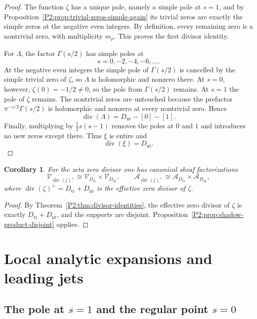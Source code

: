 \documentclass[11pt,a4paper]{article}
\numberwithin{equation}{section}
\newtheorem{corollary}[theorem]{Corollary}
\theoremstyle{definition}
\theoremstyle{remark}
\DeclareMathOperator{\divv}{div}
\newcommand{\cV}{\mathcal V}
\newcommand{\cA}{\mathcal A}
\begin{document}
\begin{proof}
The function $\zeta$ has a unique pole, namely a simple pole at $s=1$, and by Proposition~\ref{P2:prop:trivial-zeros-simple-again} its trivial zeros are exactly the simple zeros at the negative even integers.  By definition, every remaining zero is a nontrivial zero, with multiplicity $m_\rho$.  This proves the first divisor identity.

For $\Lambda$, the factor $\Gamma(s/2)$ has simple poles at
\[
s=0,-2,-4,-6,\dots.
\]
At the negative even integers the simple pole of $\Gamma(s/2)$ is cancelled by the simple trivial zero of $\zeta$, so $\Lambda$ is holomorphic and nonzero there.  At $s=0$, however, $\zeta(0)=-1/2\neq 0$, so the pole from $\Gamma(s/2)$ remains.  At $s=1$ the pole of $\zeta$ remains.  The nontrivial zeros are untouched because the prefactor $\pi^{-s/2}\Gamma(s/2)$ is holomorphic and nonzero at every nontrivial zero.  Hence
\[
\divv(\Lambda)=D_{\mathrm{nt}}-[0]-[1].
\]
Finally, multiplying by $\frac12 s(s-1)$ removes the poles at $0$ and $1$ and introduces no new zeros except there.  Thus $\xi$ is entire and
\[
\divv(\xi)=D_{\mathrm{nt}}.
\]
\end{proof}

\begin{corollary}\label{P2:cor:shadow-zeta-splits}
For the zeta zero divisor one has canonical sheaf factorizations
\[
\cV_{\divv(\zeta)^+}\cong \cV_{D_{\mathrm{tr}}}\times \cV_{D_{\mathrm{nt}}},
\qquad
\cA_{\divv(\zeta)^+}\cong \cA_{D_{\mathrm{tr}}}\times \cA_{D_{\mathrm{nt}}},
\]
where $\divv(\zeta)^+=D_{\mathrm{tr}}+D_{\mathrm{nt}}$ is the effective zero divisor of $\zeta$.
\end{corollary}

\begin{proof}
By Theorem~\ref{P2:thm:divisor-identities}, the effective zero divisor of $\zeta$ is exactly $D_{\mathrm{tr}}+D_{\mathrm{nt}}$, and the supports are disjoint.  Proposition~\ref{P2:prop:shadow-product-disjoint} applies.
\end{proof}

\section{Local analytic expansions and leading jets}

\subsection{The pole at $s=1$ and the regular point $s=0$}
\end{document}
